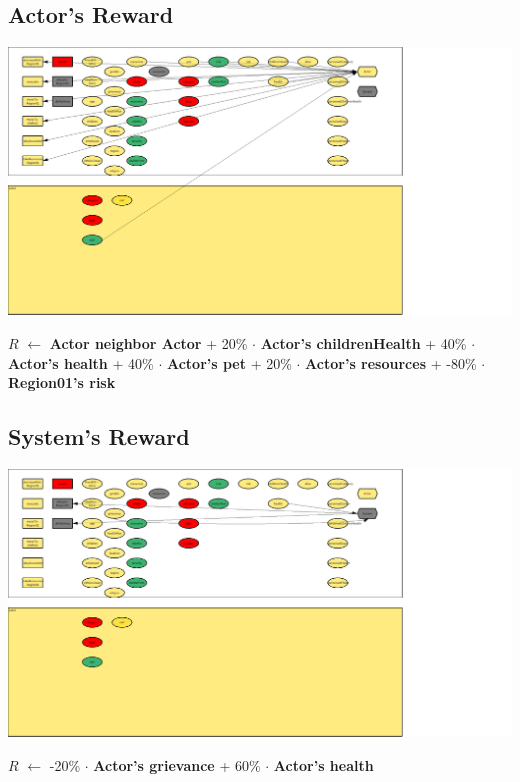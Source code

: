\documentclass{article}%
\begin{document}
\subsection{Actor's Reward}%
\label{subsec:Actor's Reward}%
\includegraphics[width=\textwidth]{images/Actor.png}%
\begin{flushleft}%
$R$%
$\leftarrow$%
\textbf{Actor neighbor Actor}%
+%
20\%%
$\cdot$%
\textbf{Actor's childrenHealth}%
+%
40\%%
$\cdot$%
\textbf{Actor's health}%
+%
40\%%
$\cdot$%
\textbf{Actor's pet}%
+%
20\%%
$\cdot$%
\textbf{Actor's resources}%
+%
{-}80\%%
$\cdot$%
\textbf{Region01's risk}%
\end{flushleft}

%
\subsection{System's Reward}%
\label{subsec:System's Reward}%
\includegraphics[width=\textwidth]{images/System.png}%
\begin{flushleft}%
$R$%
$\leftarrow$%
{-}20\%%
$\cdot$%
\textbf{Actor's grievance}%
+%
60\%%
$\cdot$%
\textbf{Actor's health}%
\end{flushleft}

%
\end{document}
